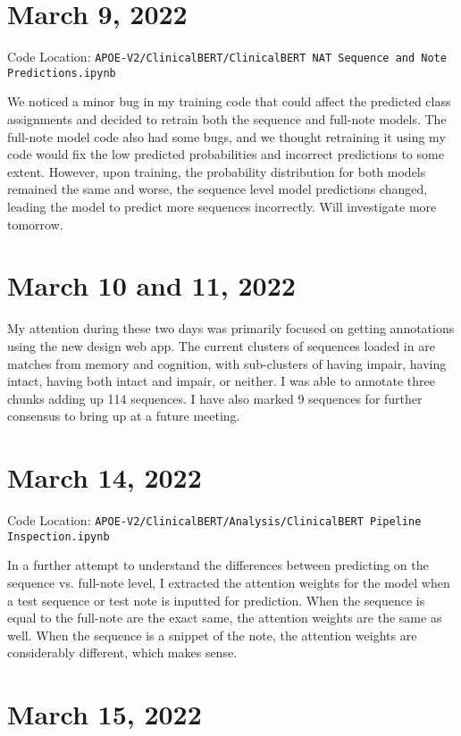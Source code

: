 \documentclass[11pt,letterpaper]{article}
\begin{document}
\section{March 9, 2022}

Code Location: \texttt{APOE-V2/ClinicalBERT/ClinicalBERT NAT Sequence and Note Predictions.ipynb}

We noticed a minor bug in my training code that could affect the predicted class assignments and decided to retrain both the sequence and full-note models. The full-note model code also had some bugs, and we thought retraining it using my code would fix the low predicted probabilities and incorrect predictions to some extent. However, upon training, the probability distribution for both models remained the same and worse, the sequence level model predictions changed, leading the model to predict more sequences incorrectly. Will investigate more tomorrow.

\section{March 10 and 11, 2022}

My attention during these two days was primarily focused on getting annotations using the new design web app. The current clusters of sequences loaded in are matches from memory and cognition, with sub-clusters of having impair, having intact, having both intact and impair, or neither. I was able to annotate three chunks adding up 114 sequences. I have also marked 9 sequences for further consensus to bring up at a future meeting.

\section{March 14, 2022}

Code Location: \texttt{APOE-V2/ClinicalBERT/Analysis/ClinicalBERT Pipeline Inspection.ipynb}

In a further attempt to understand the differences between predicting on the sequence vs. full-note level, I extracted the attention weights for the model when a test sequence or test note is inputted for prediction. When the sequence is equal to the full-note are the exact same, the attention weights are the same as well. When the sequence is a snippet of the note, the attention weights are considerably different, which makes sense. 

\section{March 15, 2022}
\end{document}
